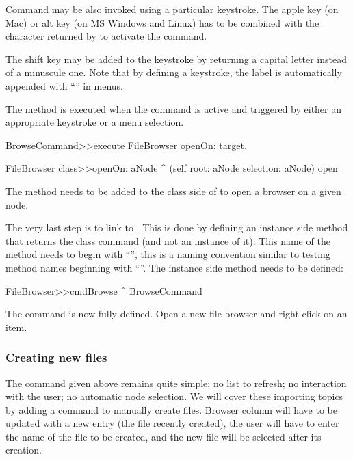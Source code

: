 \documentclass[a4paper,10pt,twoside]{book}
\begin{document}
Command may be also invoked using a particular keystroke. The apple key (on Mac) or alt key (on MS Windows and Linux) has to be combined with the character returned by  to activate the command.


The shift key may be added to the keystroke by returning a capital letter instead of a minuscule one. Note that by defining a keystroke, the label is automatically appended with ``'' in menus.

The method  is executed when the command is active and triggered by either an appropriate keystroke or a menu selection.

\begin{code}{}    
BrowseCommand>>execute
	FileBrowser openOn: target.

FileBrowser class>>openOn: aNode 
	^ (self root: aNode selection: aNode) open
\end{code}

The method  needs to be added to the class side of  to open a browser on a given node. 

The very last step is to link  to . This is done by defining an instance side method that returns the class command (and not an instance of it). This name of the method needs to begin with ``'', this is a naming convention similar to testing method names beginning with ``''. The instance side method needs to be defined:

\begin{code}{}    
FileBrowser>>cmdBrowse
	^ BrowseCommand
\end{code}

The command is now fully defined. Open a new file browser and right click on an item.

\subsubsection{Creating new files}

The command given above remains quite simple: no list to refresh; no interaction with the user; no automatic node selection. We will cover these importing topics by adding a command to manually create files. Browser column will have to be updated with a new entry (the file recently created), the user will have to enter the name of the file to be created, and the new file will be selected after its creation.
\end{document}
